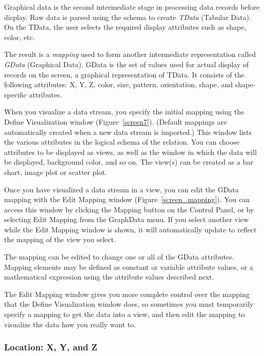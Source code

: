 Graphical data is the second intermediate stage in processing data records
before display. Raw data is parsed using the schema to create {\em TData} (Tabular Data). On
the TData, the user selects the required display attributes such as shape,
color, etc.

The result is a {\em mapping} used to form another intermediate representation
called {\em GData} (Graphical Data). GData is the set of values used for actual
display of records on the screen, a graphical representation of TData. It
consists of the following attributes: X, Y, Z, color, size, pattern,
orientation, shape, and shape-specific attributes.

When you visualize a data stream, you specify the initial mapping using
the Define Visualization window
(Figure~\ref{screen7}). (Default mappings are automatically created when a new
data stream is imported.) This window lists the various attributes in the
logical schema of the relation. You can choose attributes to be displayed as
views, as well as the window in which the data will be displayed, background
color, and so on.  The view(s) can be created as a bar chart, image plot or
scatter plot.


Once you have visualized a data stream in a view, you can edit the GData
mapping with the Edit Mapping window (Figure~\ref{screen_mapping}).  You
can access this window by clicking the Mapping button on the Control
Panel, or by selecting Edit Mapping from the GraphData menu.  If you
select another view while the Edit Mapping window is shown, it will
automatically update to reflect the mapping of the view you select.

The mapping can be edited to change one or all of the
GData attributes. Mapping elements may be defined as constant or variable
attribute values, or a mathematical expression using the attribute values
described next.

The Edit Mapping window gives you more complete control over the mapping
that the Define Visualization window does, so sometimes you must temporarily
specify a mapping to get the data into a view, and then edit the mapping
to visualize the data how you really want to.


\subsubsection{Location: X, Y, and Z}


